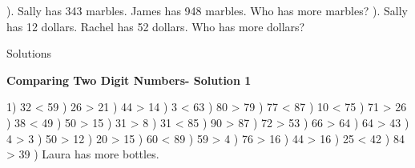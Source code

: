 \documentclass{article}%
\begin{document}
). Sally has 343 marbles. James has 948 marbles. Who has more marbles?%
\newline%
\newline%
). Sally has 12 dollars. Rachel has 52 dollars. Who has more dollars?%
\newline%
\newline%
\newline%
\pagebreak%
\huge%
\vspace*{\fill}%
\begin{center}%
Solutions%
\end{center}%
\vspace*{\fill}%
\normalsize%
\pagebreak%
\large%
\begin{center}%
\textbf{Comparing Two Digit Numbers- Solution 1}%
\newline%
\end{center} \normalsize%
1) 32 < 59%
) 26 > 21%
) 44 > 14%
) 3 < 63%
) 80 > 79%
) 77 < 87%
) 10 < 75%
) 71 > 26%
) 38 < 49%
) 50 > 15%
) 31 > 8%
) 31 < 85%
) 90 > 87%
) 72 > 53%
) 66 > 64%
) 64 > 43%
) 4 > 3%
) 50 > 12%
) 20 > 15%
) 60 < 89%
) 59 > 4%
) 76 > 16%
) 44 > 16%
) 25 < 42%
) 84 > 39%
) Laura has more bottles.%
\newline%
\end{document}
